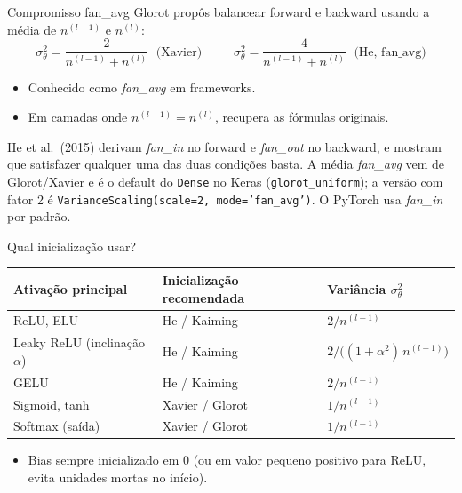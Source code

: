 \documentclass[aspectratio=169,xcolor=dvipsnames]{beamer}
\begin{document}
  \begin{frame}{Compromisso fan\_avg}
    Glorot propôs balancear forward e backward usando a média de
    $n^{(l-1)}$ e $n^{(l)}$:
    \[
      \boxed{\;\sigma_\theta^2 = \dfrac{2}{n^{(l-1)} + n^{(l)}}\;\text{ (Xavier)}\;}
      \qquad
      \boxed{\;\sigma_\theta^2 = \dfrac{4}{n^{(l-1)} + n^{(l)}}\;\text{ (He, fan\_avg)}\;}
    \]
    \begin{itemize}
      \item Conhecido como \textit{fan\_avg} em frameworks.
      \item Em camadas onde $n^{(l-1)} = n^{(l)}$, recupera as fórmulas originais.
    \end{itemize}
    \vspace{0.3em}
    {\footnotesize\color{gray!50!black}He et al.\ (2015) derivam \textit{fan\_in} no forward e \textit{fan\_out} no backward, e mostram que satisfazer qualquer uma das duas condições basta. A média \textit{fan\_avg} vem de Glorot/Xavier e é o default do \texttt{Dense} no Keras (\texttt{glorot\_uniform}); a versão com fator 2 é \texttt{VarianceScaling(scale=2, mode='fan\_avg')}. O PyTorch usa \textit{fan\_in} por padrão.}
  \end{frame}


  \begin{frame}{Qual inicialização usar?}
    \centering
    \begin{tabular}{@{}lll@{}}
      \toprule
      Ativação principal & Inicialização recomendada & Variância $\sigma_\theta^2$ \\
      \midrule
      ReLU, ELU            & He / Kaiming           & $2/n^{(l-1)}$            \\
      Leaky ReLU (inclinação $\alpha$) & He / Kaiming & $2/\big((1+\alpha^2)\,n^{(l-1)}\big)$ \\
      GELU                 & He / Kaiming           & $2/n^{(l-1)}$            \\
      Sigmoid, tanh        & Xavier / Glorot        & $1/n^{(l-1)}$            \\
      Softmax (saída)      & Xavier / Glorot        & $1/n^{(l-1)}$            \\
      \bottomrule
    \end{tabular}
    \vfill
    \begin{itemize}
      \item Bias sempre inicializado em 0 (ou em valor pequeno positivo para ReLU,
        evita unidades mortas no início).
    \end{itemize}
  \end{frame}
\end{document}
